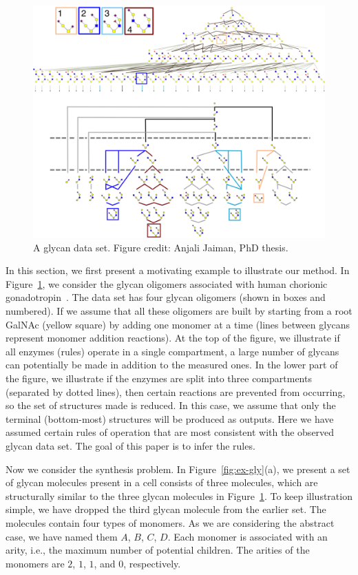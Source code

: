\begin{figure}[t]
\centering
\includegraphics[width=1\linewidth]{gfig2.png}
\caption{A glycan data set. Figure credit: Anjali Jaiman, PhD thesis.}
\label{fig:dataset-gly}
\end{figure}



In this section, we first present a motivating example to illustrate our method.
In Figure~\ref{fig:dataset-gly},
we consider the glycan oligomers associated with human chorionic
gonadotropin~\cite{Harrd1992}.
The data set has four glycan oligomers (shown in boxes and numbered). If we assume that all these oligomers
are built by starting from a root GalNAc (yellow square) by adding one monomer at a
time (lines between glycans represent monomer addition reactions). At the top of the figure, we illustrate
if all enzymes (rules) operate in a
single compartment, a large number of glycans can potentially be made in addition to the measured ones.
In the lower part of the figure, we illustrate if the enzymes are split into three compartments
(separated by dotted lines), then certain reactions are prevented from occurring, so the set of structures
made is reduced.
In this case, we assume that only the terminal (bottom-most) structures will be produced as outputs.
Here we have assumed certain rules of operation that are most consistent with the observed glycan data set.
The goal of this paper is to infer the rules.


Now we consider the synthesis problem. In Figure~\ref{fig:ex-gly}(a), we present a set of
glycan molecules present in a cell consists of three molecules, which are structurally similar to the three glycan molecules in Figure~\ref{fig:dataset-gly}.
To keep illustration simple, we have dropped the
third glycan molecule from the earlier set.
The molecules contain four types of monomers.
As we are considering the abstract case, we have named them $A$, $B$, $C$, $D$.
Each monomer is associated with an arity, i.e.,
the maximum number of potential children.
The arities of the monomers are $2$, $1$, $1$, and $0$, respectively.

